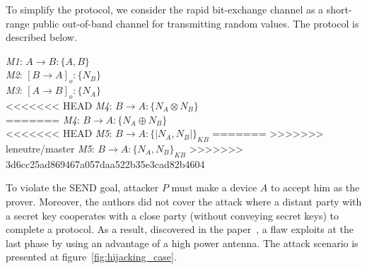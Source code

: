 To simplify the protocol, we consider the rapid bit-exchange channel as a short-range public out-of-band channel for transmitting random values. The protocol is described below. 

\begin{center}
\begin{flushleft}
 \emph{M1}: $A \rightarrow B :\{A,B\}$ \\
\emph{M2}: $[B \rightarrow A]_o :\{N_B\}$ \\
\emph{M3}: $[A \rightarrow B]_o : \{N_A\}$\\
<<<<<<< HEAD
\emph{M4}: $B \rightarrow A :\{N_A \otimes N_B\}$ \\
=======
\emph{M4}: $B \rightarrow A :\{N_A \oplus N_B\}$ \\
<<<<<<< HEAD
\emph{M5}: $B \rightarrow A : \{|N_A,N_B|\}_{KB}$
=======
>>>>>>> leneutre/master
\emph{M5}: $B \rightarrow A : \{N_A,N_B\}_{KB}$
>>>>>>> 3d6cc25ad869467a057daa522b35e3cad82b4604
\end{flushleft}
\end{center}

To violate the SEND goal, attacker $P$ must make a device $A$ to accept him as the prover. Moreover, the authors did not cover the attack where a distant party with a secret key cooperates with a close party (without conveying secret keys) to complete a protocol. As a result, discovered in the paper~\cite{6234408}, a flaw exploits at the last phase by using an advantage of a high power antenna. The attack scenario is presented at figure~\ref{fig:hijacking_case}. 

